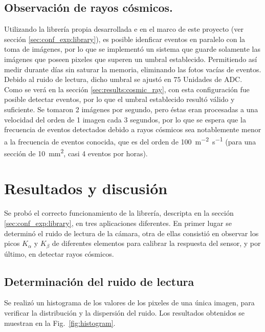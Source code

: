 \documentclass[twoside,twocolumn]{article}
\begin{document}
    \subsection{Observación de rayos cósmicos.}\label{sec:conf_exp:cosmic_ray}
      Utilizando la librería propia desarrollada e en el marco de este proyecto (ver sección \ref{sec:conf_exp:library}),
      es posible idenficar eventos en paralelo con la toma de imágenes,
      por lo que se implementó un sistema que guarde solamente las imágenes que poseen pixeles que superen un umbral establecido.
      Permitiendo así medir durante días sin saturar la memoria, eliminando las fotos vacías de eventos.
      Debido al ruido de lectura, dicho umbral se ajustó en $75$ Unidades de ADC. %
      Como se verá en la sección \ref{sec:results:cosmic_ray}, con esta configuración fue posible detectar eventos,
      por lo que el umbral establecido resultó válido y suficiente.
      Se tomaron 2 imágenes por segundo, pero éstas eran procesadas a una velocidad
      del orden de 1 imagen cada 3 segundos, por lo que se espera que la frecuencia de eventos
      detectados debido a rayos cósmicos sea notablemente menor a la frecuencia de eventos conocida,
      que es del orden de \SI{100}{\meter^{-2}\second^{-1}}
      (para una sección de \SI{10}{\milli\meter^2}, casi 4 eventos por horas).

  \section{Resultados y discusión}\label{sec:results}
    Se probó el correcto funcionamiento de la librería, descripta en la sección \ref{sec:conf_exp:library},
    en tres aplicaciones diferentes.
    En primer lugar se determinó el ruido de lectura de la cámara,
    otra de ellas consistió en observar los picos $K_{\alpha}$ y $K_{\beta}$ de diferentes elementos
    para calibrar la respuesta del sensor,
    y por último, en detectar rayos cósmicos.

    \subsection{Determinación del ruido de lectura}\label{sec:results:background}
      Se realizó un histograma de los valores de los pixeles de una única imagen,
      para verificar la distribución y la dispersión del ruido.
      Los resultados obtenidos se muestran en la Fig.~\ref{fig:histogram}.
\end{document}
